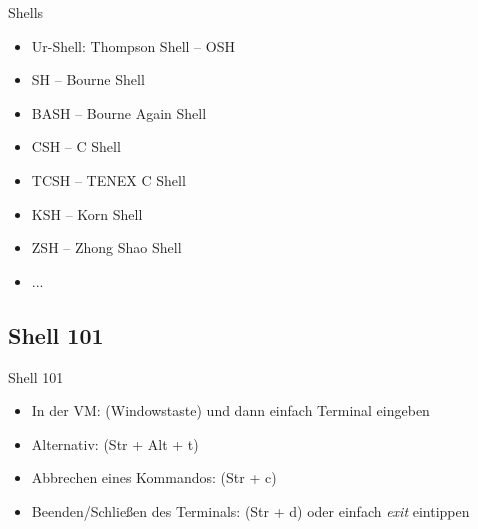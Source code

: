 \documentclass[xcolor=dvipsnames,aspectratio=169]{beamer}
\begin{document}
\begin{frame}{Shells}
	\begin{itemize}
		\item Ur-Shell: Thompson Shell -- OSH
		\item SH -- Bourne Shell 
		\item BASH -- Bourne Again Shell
		\item CSH -- C Shell
		\item TCSH -- TENEX C Shell
		\item KSH -- Korn Shell
		\item ZSH -- Zhong Shao Shell
		\item ...
	\end{itemize}
\end{frame}

\subsection{Shell 101}
\begin{frame}{Shell 101}
	\begin{itemize}
		\item In der VM: \keys{\winmenu} (Windowstaste) und dann einfach Terminal eingeben
		\item Alternativ:  (Str + Alt + t)
		\item Abbrechen eines Kommandos:  (Str + c)
		\item Beenden/Schließen des Terminals:  (Str + d) oder einfach \emph{exit} eintippen
	\end{itemize}
\end{frame}
\end{document}
